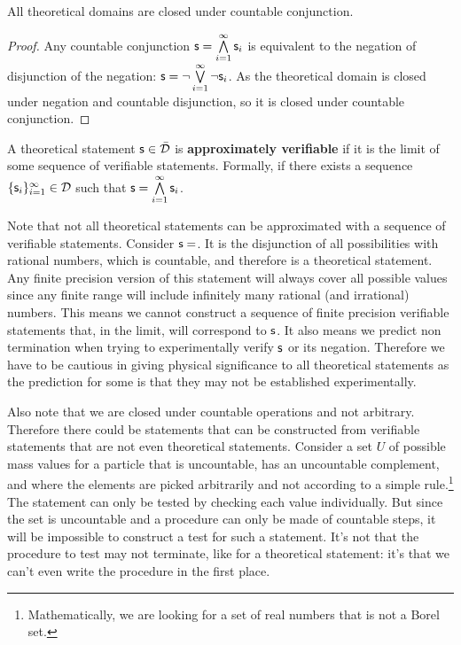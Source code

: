 \documentclass[11pt,letterpaper,fleqn]{memoir} %
\begin{document}
\begin{mathSection}
	\begin{prop}
		All theoretical domains are closed under countable conjunction.
	\end{prop}
	
	\begin{proof}
		Any countable conjunction $\mathsf{s} = \bigwedge\limits_{i=1}^{\infty} \mathsf{s}_i$ is equivalent to the negation of disjunction of the negation: $\mathsf{s} = \neg\bigvee\limits_{i=1}^{\infty} \neg\mathsf{s}_i$. As the theoretical domain is closed under negation and countable disjunction, so it is closed under countable conjunction.  
	\end{proof}

	\begin{defn}\label{def_approximately_verifiable}
		A theoretical statement $\mathsf{s} \in \bar{\mathcal{D}}$ is \textbf{approximately verifiable} if it is the limit of some sequence of verifiable statements. Formally, if there exists a sequence $\{\mathsf{s}_i\}_{i=1}^{\infty} \in \mathcal{D}$ such that $\mathsf{s} = \bigwedge\limits_{i=1}^{\infty} \mathsf{s}_i$.
	\end{defn}
\end{mathSection}

Note that not all theoretical statements can be approximated with a sequence of verifiable statements. Consider $\mathsf{s}=$. It is the disjunction of all possibilities with rational numbers, which is countable, and therefore is a theoretical statement. Any finite precision version of this statement will always cover all possible values since any finite range will include infinitely many rational (and irrational) numbers. This means we cannot construct a sequence of finite precision verifiable statements that, in the limit, will correspond to $\mathsf{s}$. It also means we predict non termination when trying to experimentally verify $\mathsf{s}$ or its negation. Therefore we have to be cautious in giving physical significance to all theoretical statements as the prediction for some is that they may not be established experimentally.

Also note that we are closed under countable operations and not arbitrary. Therefore there could be statements that can be constructed from verifiable statements that are not even theoretical statements. Consider a set $U$ of possible mass values for a particle that is uncountable, has an uncountable complement, and where the elements are picked arbitrarily and not according to a simple rule.\footnote{Mathematically, we are looking for a set of real numbers that is not a Borel set.} The statement  can only be tested by checking each value individually. But since the set is uncountable and a procedure can only be made of countable steps, it will be impossible to construct a test for such a statement. It's not that the procedure to test may not terminate, like for a theoretical statement: it's that we can't even write the procedure in the first place.
\end{document}
